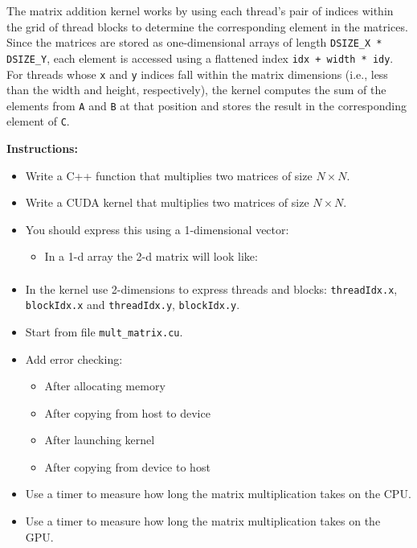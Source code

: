 \documentclass{article}
\newcounter{exercise}
\newenvironment{exr}[1]{%
    \refstepcounter{exercise}
    \begin{tcolorbox}[colback=blue!5!white, colframe=blue!75!black, title=Exercise \theexercise]
    \textbf{Instructions:} #1
    \end{tcolorbox}
    \vspace{1em}
}{}
\begin{document}
The matrix addition kernel works by using each thread’s pair of indices within the grid of thread blocks to determine the corresponding element in the matrices. Since the matrices are stored as one-dimensional arrays of length \texttt{DSIZE\_X * DSIZE\_Y}, each element is accessed using a flattened index \texttt{idx + width * idy}. For threads whose \texttt{x} and \texttt{y} indices fall within the matrix dimensions (i.e., less than the width and height, respectively), the kernel computes the sum of the elements from \texttt{A} and \texttt{B} at that position and stores the result in the corresponding element of \texttt{C}.








\begin{exr}{
    \begin{itemize}
      \item Write a C++ function that multiplies two matrices of size $N\times N$.
      \item Write a CUDA kernel that multiplies two matrices of size $N\times N$.
      \item You should express this using a 1-dimensional vector:
        \begin{itemize}
          \item In a 1-d array the 2-d matrix will look like: 
          \begin{align*}
              [A_{11},\, A_{12},\, A_{13},\, \dots,\, A_{1N}, A_{21},\, A_{22},\, \dots,\, A_{2N}, \dots, A_{N1},\, A_{N2},\, \dots,\, A_{NN}]
          \end{align*}
        \end{itemize}
      \item In the kernel use 2-dimensions to express threads and blocks: \texttt{threadIdx.x}, \texttt{blockIdx.x} and \texttt{threadIdx.y}, \texttt{blockIdx.y}.
      \item Start from file \texttt{mult\_matrix.cu}.
      \item Add error checking:
        \begin{itemize}
          \item After allocating memory
          \item After copying from host to device
          \item After launching kernel
          \item After copying from device to host
        \end{itemize}
      \item Use a timer to measure how long the matrix multiplication takes on the CPU.
      \item Use a timer to measure how long the matrix multiplication takes on the GPU.
    \end{itemize}
}\end{exr}
\end{document}
